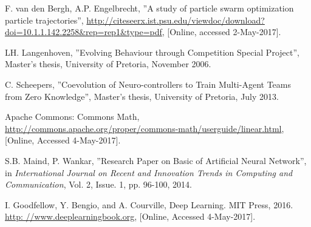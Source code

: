 \newpage

\begin{thebibliography}{9}
F. van den Bergh, A.P. Engelbrecht, ''A study of particle swarm optimization particle trajectories'', \url{http://citeseerx.ist.psu.edu/viewdoc/download?doi=10.1.1.142.2258&rep=rep1&type=pdf}, [Online, accessed 2-May-2017].




LH. Langenhoven, ''Evolving Behaviour through Competition Special Project'', Master's thesis, University of Pretoria, November 2006.

C. Scheepers, ''Coevolution of Neuro-controllers to Train Multi-Agent Teams from Zero Knowledge'', Master's thesis, University of Pretoria, July 2013.

Apache Commons: Commons Math, \url{http://commons.apache.org/proper/commons-math/userguide/linear.html}, [Online, Accessed 4-May-2017].

S.B. Maind, P. Wankar, ''Research Paper on Basic of Artificial Neural Network'', in \textit{International Journal on Recent and Innovation Trends in Computing and Communication}, Vol. 2, Issue. 1, pp. 96-100, 2014.

I. Goodfellow, Y. Bengio, and A. Courville, Deep Learning. MIT Press, 2016. \url{http: //www.deeplearningbook.org}, [Online, Accessed 4-May-2017].









\end{thebibliography}
